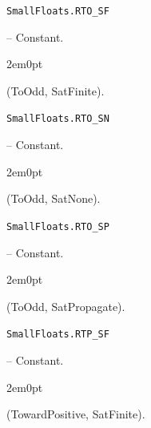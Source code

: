 \par\medskip\noindent\begin{minipage}{\linewidth}
\hypertarget{17370994210103718270}{\texttt{SmallFloats.RTO\_\allowbreak{}SF}}  -- {Constant.}
\nopagebreak
\begin{adjustwidth}{2em}{0pt}

(ToOdd, SatFinite).



\end{adjustwidth}
\end{minipage}
\par\medskip

\par\medskip\noindent\begin{minipage}{\linewidth}
\hypertarget{8851151326547106986}{\texttt{SmallFloats.RTO\_\allowbreak{}SN}}  -- {Constant.}
\nopagebreak
\begin{adjustwidth}{2em}{0pt}

(ToOdd, SatNone).



\end{adjustwidth}
\end{minipage}
\par\medskip

\par\medskip\noindent\begin{minipage}{\linewidth}
\hypertarget{6365993733773253093}{\texttt{SmallFloats.RTO\_\allowbreak{}SP}}  -- {Constant.}
\nopagebreak
\begin{adjustwidth}{2em}{0pt}

(ToOdd, SatPropagate).



\end{adjustwidth}
\end{minipage}
\par\medskip

\par\medskip\noindent\begin{minipage}{\linewidth}
\hypertarget{10475668134315902188}{\texttt{SmallFloats.RTP\_\allowbreak{}SF}}  -- {Constant.}
\nopagebreak
\begin{adjustwidth}{2em}{0pt}

(TowardPositive, SatFinite).



\end{adjustwidth}
\end{minipage}
\par\medskip

